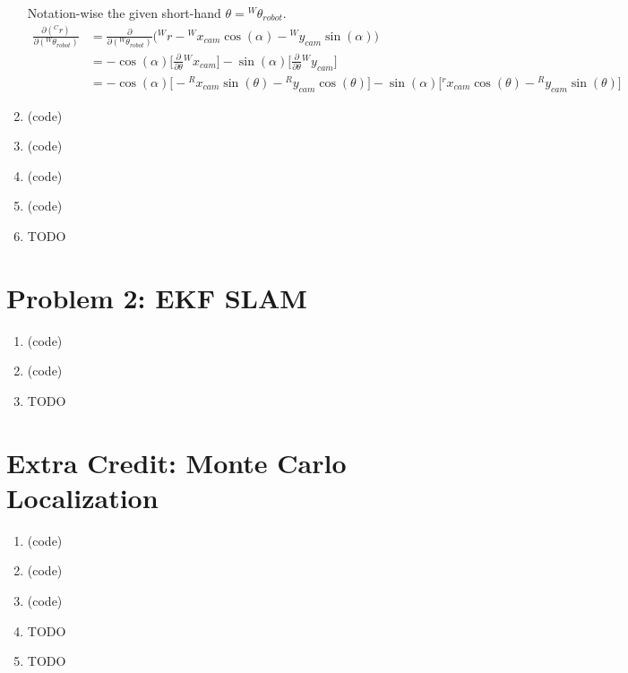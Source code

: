 \documentclass{article}
\begin{document}
\begin{enumerate}[label=(\roman*)]
Notation-wise the given short-hand $\theta = {}^W\theta_{robot}$.
\begin{equation}
\begin{aligned}
\frac{\partial ({}^C r)}{\partial ({}^W \theta_{robot})}
&= \frac{\partial}{\partial ({}^W \theta_{robot})} \Big( {}^W r - {}^W x_{cam} \cos(\alpha) - {}^W y_{cam} \sin(\alpha) \Big) \\
&= -\cos(\alpha) \Big[\frac{\partial}{\partial\theta} {}^Wx_{cam}\Big] - \sin(\alpha) \Big[\frac{\partial}{\partial\theta} {}^Wy_{cam}\Big] \\
&= -\cos(\alpha) \Big[ -{}^Rx_{cam} \sin(\theta) - {}^Ry_{cam} \cos(\theta) \Big] -\sin(\alpha) \Big[ {}^rx_{cam}\cos(\theta) - {}^Ry_{cam}\sin(\theta) \Big]
\end{aligned}
\end{equation}

\item %
(code)

\item %
(code)

\item %
(code)

\item %
(code)

\item %
TODO

\end{enumerate}

\section*{Problem 2: EKF SLAM}
\begin{enumerate}[label=(\roman*)]
\item %
(code)

\item %
(code)

\item %
TODO

\end{enumerate}

\section*{Extra Credit: Monte Carlo Localization}
\begin{enumerate}[label=(\roman*)]
\item %
(code)

\item %
(code)

\item %
(code)

\item %
TODO

\item %
TODO

\end{enumerate}
\end{document}
